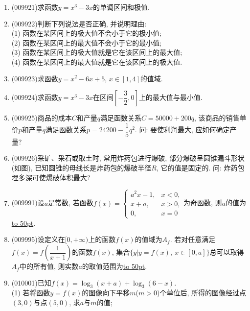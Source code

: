 \documentclass[10pt,a4paper]{article}
\newcommand{\blank}[1]{\underline{\hbox to #1pt{}}}
\begin{document}
\begin{enumerate}[1.]
\item {\tiny (009921)}求函数$y=x^3-3x$的单调区间和极值.
\item {\tiny (009922)}判断下列说法是否正确, 并说明理由:\\
(1) 函数在某区间上的极大值不会小于它的极小值;\\
(2) 函数在某区间上的最大值不会小于它的最小值;\\
(3) 函数在某区间上的极大值就是它在该区间上的最大值;\\
(4) 函数在某区间上的最大值就是它在该区间上的极大值.
\item {\tiny (009923)}求函数$y=x^2-6x+5$, $x\in [1, 4]$的值域.
\item {\tiny (009924)}求函数$y=x^3-3x$在区间$[-\dfrac 32,0]$上的最大值与最小值.
\item {\tiny (009925)}商品的成本$C$和产量$q$满足函数关系$C=50000+200q$, 该商品的销售单价$p$和产量$q$满足函数关系$p=24200-\dfrac 15q^2$. 问: 要使利润最大, 应如何确定产量?
\item {\tiny (009926)}采矿、采石或取土时, 常用炸药包进行爆破, 部分爆破呈圆锥漏斗形状(如图), 已知圆锥的母线长是炸药包的爆破半径$R$, 它的值是固定的. 问: 炸药包埋多深可使爆破体积最大? 
\begin{center}
\end{center}
\item {\tiny (009991)}设$a$是常数, 若函数$f(x)=\begin{cases} a^2x-1, & x<0, \\ x+a, & x>0, \\ 0, & x=0 \end{cases}$为奇函数, 则$a$的值为\blank{50}.
\item {\tiny (009995)}设定义在$[0,+\infty)$上的函数$f(x)$的值域为$A_f$. 若对任意满足$f(x)=f(\dfrac 1{x+1})$的函数$f(x)$, 集合$\{y|y=f(x), \ x\in [0,a]\}$总可以取得$A_f$中的所有值, 则实数$a$的取值范围为\blank{50}.
\item {\tiny (010001)}已知$f(x)=\log_3(x+a)+\log_3(6-x)$.\\
(1) 若将函数$y=f(x)$的图像向下平移$m$($m>0$)个单位后, 所得的图像经过点$(3,0)$与点$(5,0)$, 求$a$与$m$的值;\\

\end{enumerate}
\end{document}
